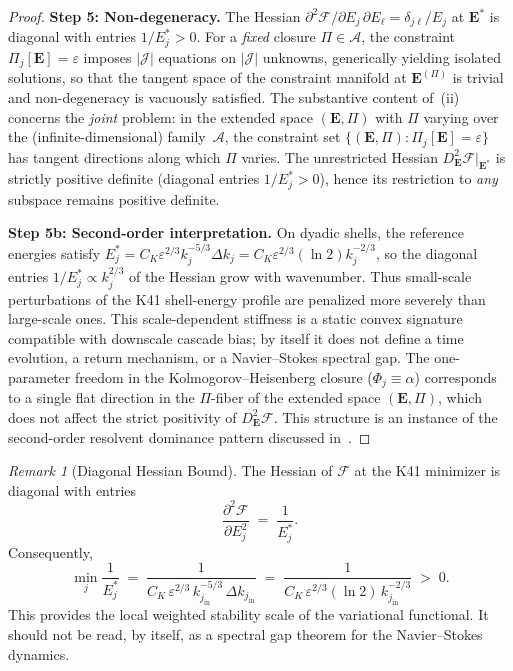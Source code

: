 \documentclass[12pt,a4paper]{article}
\theoremstyle{definition}
\theoremstyle{plain}
\theoremstyle{remark}
\newtheorem{remark}[definition]{Remark}
\begin{document}
\begin{proof}
\textbf{Step 5: Non-degeneracy.}\;
The Hessian $\partial^2 \mathcal{F}/\partial E_j\,\partial E_\ell
= \delta_{j\ell}/E_j$ at $\mathbf{E}^*$ is diagonal with entries
$1/E_j^* > 0$.  For a \emph{fixed} closure $\Pi \in \mathscr{A}$, the
constraint $\Pi_j[\mathbf{E}] = \varepsilon$ imposes $|\mathcal{J}|$
equations on $|\mathcal{J}|$ unknowns, generically yielding isolated
solutions, so that the tangent space of the constraint manifold at
$\mathbf{E}^{(\Pi)}$ is trivial and non-degeneracy is vacuously satisfied.
The substantive content of~(ii) concerns the \emph{joint} problem: in the
extended space $(\mathbf{E}, \Pi)$ with $\Pi$ varying over the
(infinite-dimensional) family~$\mathscr{A}$, the constraint set
$\{(\mathbf{E}, \Pi) : \Pi_j[\mathbf{E}] = \varepsilon\}$ has tangent
directions along which $\Pi$ varies.  The unrestricted Hessian
$D^2_{\mathbf{E}}\mathcal{F}|_{\mathbf{E}^*}$ is strictly positive
definite (diagonal entries $1/E_j^* > 0$), hence its restriction to
\emph{any} subspace remains positive definite.

\medskip
\noindent\textbf{Step 5b: Second-order interpretation.}\;
On dyadic shells, the reference energies satisfy
$E_j^* = C_K\varepsilon^{2/3}k_j^{-5/3}\Delta k_j = C_K\varepsilon^{2/3}(\ln 2)k_j^{-2/3}$,
so the diagonal entries $1/E_j^* \propto k_j^{2/3}$ of the Hessian grow with
wavenumber.  Thus small-scale perturbations of the K41 shell-energy profile
are penalized more severely than large-scale ones.  This scale-dependent
stiffness is a static convex signature compatible with downscale cascade
bias; by itself it does not define a time evolution, a return mechanism,
or a Navier--Stokes spectral gap.  The one-parameter
freedom in the Kolmogorov--Heisenberg closure ($\Phi_j \equiv \alpha$)
corresponds to a single flat direction in the $\Pi$-fiber of the
extended space $(\mathbf{E}, \Pi)$, which does not affect the strict
positivity of $D^2_{\mathbf{E}}\mathcal{F}$.  This structure is an
instance of the second-order resolvent dominance pattern discussed
in~\cite{FST-Unified2026}.
\end{proof}

\begin{remark}[Diagonal Hessian Bound]\label{rem:hessian}
The Hessian of $\mathcal{F}$ at the K41 minimizer is diagonal with entries
\[
  \frac{\partial^2\mathcal{F}}{\partial E_j^2}
  \;=\; \frac{1}{E_j^*}.
\]
Consequently,
\[
  \min_j\frac{1}{E_j^*}
  \;=\;
  \frac{1}{C_K\,\varepsilon^{2/3}\,k_{j_{\mathrm{in}}}^{-5/3}\,
  \Delta k_{j_{\mathrm{in}}}}
  \;=\;
  \frac{1}{C_K\,\varepsilon^{2/3}(\ln 2)\,
  k_{j_{\mathrm{in}}}^{-2/3}}
  \;>\; 0.
\]
This provides the local weighted stability scale of the variational
functional.  It should not be read, by itself, as a spectral gap theorem
for the Navier--Stokes dynamics.
\end{remark}
\end{document}
